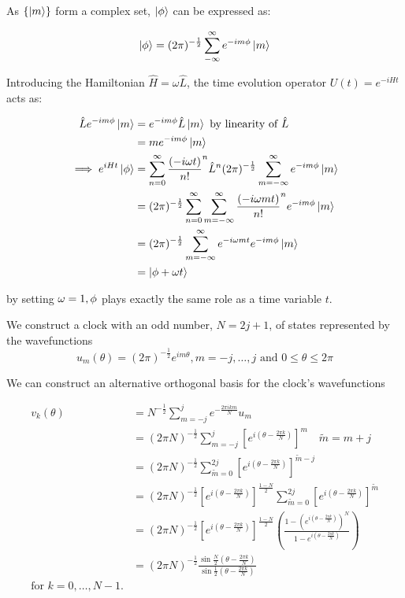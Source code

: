 \documentclass{article}
\begin{document}
\noindent As $\{\ket{m}\}$ form a complex set, $\ket{\phi}$ can be expressed as:

\begin{equation}
	\ket{\phi} = (2\pi)^{-\frac{1}{2}}\sum_{-\infty}^{\infty}e^{-im\phi}\ket{m}
\end{equation}

\noindent Introducing the Hamiltonian $\hat{H}=\omega \hat{L}$, the time evolution operator $U(t) = e^{-iHt}$ acts as:

\begin{align}
\hat{L}e^{-im\phi}\ket{m} &= e^{-im\phi}\hat{L}\ket{m} \text{ by linearity of } \hat{L} \\
				  &= me^{-im\phi}\ket{m} \\
\implies e^{iHt}\ket{\phi} &= \sum_{n=0}^{\infty}\frac{(-i\omega t)}{n!}^n \hat{L}^n (2\pi)^{-\frac{1}{2}}\sum_{m=-\infty}^{\infty}e^{-im\phi}\ket{m} \\
			   &= (2\pi)^{-\frac{1}{2}}\sum_{n=0}^{\infty}\sum_{m=-\infty}^{\infty} \frac{(-i\omega mt)}{n!}^n e^{-im\phi} \ket{m} \\
				   &= (2\pi)^{-\frac{1}{2}}\sum_{m=-\infty}^{\infty}e^{-i\omega mt}e^{-im\phi}\ket{m} \\
				   &= \ket{\phi+\omega t}
\end{align}

\noindent by setting $\omega = 1, \space \phi$ plays exactly the same role as a time variable $t$.

We construct a clock with an odd number, $N=2j+1$, of states represented by the wavefunctions \[
	u_m(\theta) = (2\pi)^{-\frac{1}{2}}e^{im\theta}, m = -j,\dots, j \text{ and } 0 \leq \theta \leq 2\pi
\] 

We can construct an alternative orthogonal basis for the clock's wavefunctions

\begin{align}
	v_k(\theta) &= N^{-\frac{1}{2}}\sum_{m=-j}^j e^{-\frac{2\pi ikm}{N}}u_m \\
		    &= (2\pi N)^{-\frac{1}{2}}\sum_{m=-j}^j [e^{i(\theta-\frac{2\pi k}{N})}]^m \quad \tilde{m} = m+j \\
		    &= (2\pi N)^{-\frac{1}{2}}\sum_{\tilde{m}=0}^{2j} [e^{i(\theta-\frac{2\pi k}{N})}]^{\tilde{m}-j} \\
		    &= (2\pi N)^{-\frac{1}{2}}[e^{i(\theta-\frac{2\pi k}{N})}]^{\frac{1-N}{2}}\sum_{\tilde{m}=0}^{2j}[e^{i(\theta-\frac{2\pi k}{N})}]^{\tilde{m}} \\
		    &= (2\pi N)^{-\frac{1}{2}}[e^{i(\theta-\frac{2\pi k}{N})}]^{\frac{1-N}{2}}\left(\frac{1-(e^{i(\theta-\frac{2\pi k}{N})})^N}{1-e^{i(\theta-\frac{2\pi k}{N})}}\right) \\
		    &= (2\pi N)^{-\frac{1}{2}}\frac{\sin{\frac{N}{2}(\theta-\frac{2\pi k}{N})}}{\sin{\frac{1}{2}(\theta-\frac{2\pi k}{N})}} \\
		    \text{for } k = 0,\dots,N-1.
\end{align}
\end{document}
